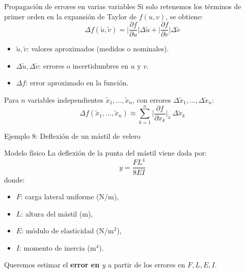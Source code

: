\documentclass[main.tex]{subfiles}
\begin{document}
\begin{frame}{Propagación de errores en varias variables}
\small
Si solo retenemos los términos de primer orden en la expansión de Taylor de \(f(u,v)\), se obtiene:
\[
\Delta f(\tilde{u},\tilde{v}) = 
\Big|\frac{\partial f}{\partial u}\Big| \Delta \tilde{u}
+ \Big|\frac{\partial f}{\partial v}\Big| \Delta \tilde{v}
\]

\begin{itemize}
  \item \(\tilde{u}, \tilde{v}\): valores aproximados (medidos o nominales).
  \item \(\Delta \tilde{u}, \Delta \tilde{v}\): errores o incertidumbres en \(u\) y \(v\).
  \item \(\Delta f\): error aproximado en la función.
\end{itemize}

Para \(n\) variables independientes \(\tilde{x}_1,\dots,\tilde{x}_n\), con errores \(\Delta \tilde{x}_1,\dots,\Delta \tilde{x}_n\):
\[
\Delta f(\tilde{x}_1,\dots,\tilde{x}_n) \approx
\sum_{k=1}^{n}
\Big|\frac{\partial f}{\partial x_k}\Big|_{\tilde{x}}\, \Delta \tilde{x}_k
\]
\end{frame}
\begin{frame}{Ejemplo 8: Deflexión de un mástil de velero}
\small
\begin{block}{Modelo físico}
La deflexión de la punta del mástil viene dada por:
\[
 y = \frac{F L^4}{8 E I}
\]
donde:
\begin{itemize}
  \item \(F\): carga lateral uniforme (N/m),
  \item \(L\): altura del mástil (m),
  \item \(E\): módulo de elasticidad (N/m\(^2\)),
  \item \(I\): momento de inercia (m\(^4\)).
\end{itemize}
\end{block}

Queremos estimar el \textbf{error en \(y\)} a partir de los errores en \(F, L, E, I\).
\end{frame}
\end{document}
